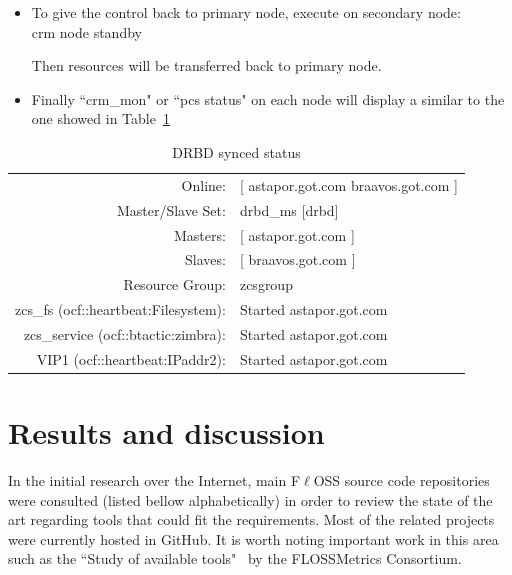 \documentclass[a4paper, 12pt]{book}
\begin{document}
\begin{itemize}
	\item To give the control back to primary node, execute on secondary node:\\
			crm node standby
			
		  Then resources will be transferred back to primary node.
\end{itemize}


\begin{itemize}
	\item Finally ``crm\_mon" or ``pcs status" on each node will display a similar to the one showed in Table~\ref{table:sync}
\end{itemize}

\FloatBarrier
\begin{table}[H]
  \centering
  \begin{tabular}{ | r l | }
    \hline
      Online:                   & [ astapor.got.com braavos.got.com ]\\
      Master/Slave Set: 		& 	drbd\_ms [drbd]\\
      Masters: 					& [ astapor.got.com ]\\
      Slaves: 					& [ braavos.got.com ]\\
      Resource Group: 			& zcsgroup\\
      zcs\_fs (ocf::heartbeat:Filesystem): & Started astapor.got.com\\
      zcs\_service (ocf::btactic:zimbra):  & Started astapor.got.com\\
      VIP1 (ocf::heartbeat:IPaddr2):       & Started astapor.got.com\\
    \hline
  \end{tabular}
\caption{DRBD synced status}
\label{table:sync}
\end{table}


%
\chapter{Results and discussion}
\label{chap:results}

In the initial research over the Internet, main F$\ell$OSS source code repositories were consulted (listed bellow alphabetically) in order to review the state of the art regarding tools that could fit the requirements. Most of the related projects were currently hosted in GitHub. It is worth noting important work in this area such as the ``Study of available tools"~\cite{FMC} by the FLOSSMetrics Consortium.
\end{document}
